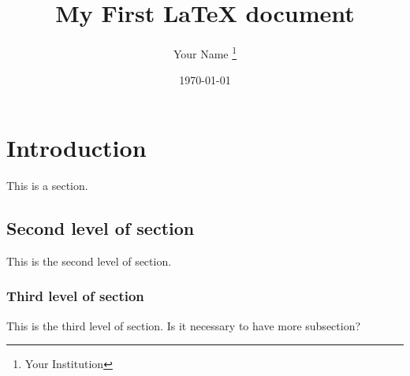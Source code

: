 \documentclass{article}
\title{My First \LaTeX{} document}
\author{Your Name \thanks{Your Institution}}
\date{\today}
\begin{document}
\maketitle

\section{Introduction}

This is a section.

\subsection{Second level of section}

This is the second level of section.

\subsubsection{Third level of section}

This is the third level of section.
Is it necessary to have more subsection?
\end{document}

